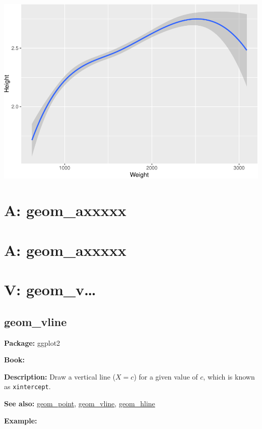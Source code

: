 \documentclass[
]{book}
\begin{document}
\includegraphics{Data-Visualisation-geom-Encyclopedia_files/figure-latex/unnamed-chunk-49-1.pdf}

\hypertarget{a-geom_axxxxx-8}{%
\chapter{A: geom\_axxxxx}\label{a-geom_axxxxx-8}}

\hypertarget{a-geom_axxxxx-9}{%
\chapter{A: geom\_axxxxx}\label{a-geom_axxxxx-9}}

\hypertarget{v-geom_v}{%
\chapter{V: geom\_v\ldots{}}\label{v-geom_v}}

\hypertarget{vline}{%
\section{geom\_vline}\label{vline}}

\textbf{Package: } ggplot2 \autocite{R-ggplot2}

\textbf{Book: }

\textbf{Description: } Draw a vertical line (\(X=c\)) for a given value of \(c\), which is known as \texttt{xintercept}.

\textbf{See also: } \protect\hyperlink{point}{geom\_point}, \protect\hyperlink{vline}{geom\_vline}, \protect\hyperlink{hline}{geom\_hline}

\textbf{Example:}
\end{document}
